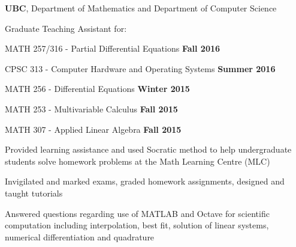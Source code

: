 \documentclass[margin,line]{res}
\newenvironment{list1}{
  \begin{list}{\ding{113}}{
      \setlength{\itemsep}{0in}
      \setlength{\parsep}{0in} \setlength{\parskip}{0in}
      \setlength{\topsep}{0in} \setlength{\partopsep}{0in} 
      \setlength{\leftmargin}{0.17in}}}{\end{list}}
\newenvironment{list3}{
  \begin{list}{\textopenbullet}{
      \setlength{\itemsep}{0in}
      \setlength{\parsep}{0in} \setlength{\parskip}{0in}
      \setlength{\topsep}{0in} \setlength{\partopsep}{0in} 
      \setlength{\leftmargin}{0.1in}}}{\end{list}}
\begin{document}
\begin{resume}
{\bf  UBC}, Department of Mathematics and Department of Computer Science\\
\vspace*{-.2cm}
\begin{list1}
\setlength\itemsep{0.25em}
\item[] Graduate Teaching Assistant for:\\[-0.1cm]
\item[] MATH 257/316 - Partial Differential Equations \hfill {\bf Fall 2016}
\item[] CPSC 313 - Computer Hardware and Operating Systems \hfill {\bf Summer 2016}
\item[] MATH 256 - Differential Equations \hfill {\bf Winter 2015}
\item[] MATH 253 - Multivariable Calculus \hfill {\bf Fall 2015}
\item[] MATH 307 - Applied Linear Algebra \hfill {\bf Fall 2015}\\
\begin{list3}
\vspace*{-.1cm}
\setlength\itemsep{0.25em}
\item Provided learning assistance and used Socratic method to help undergraduate students solve homework problems at the Math Learning Centre (MLC)
\item Invigilated and marked exams, graded homework assignments, designed and taught tutorials
\item Answered questions regarding use of MATLAB and Octave for scientific computation including interpolation, best fit, solution of linear systems, numerical differentiation and quadrature
\end{list3}
\end{list1}
\vspace*{.1cm}


\end{resume}
\end{document}
